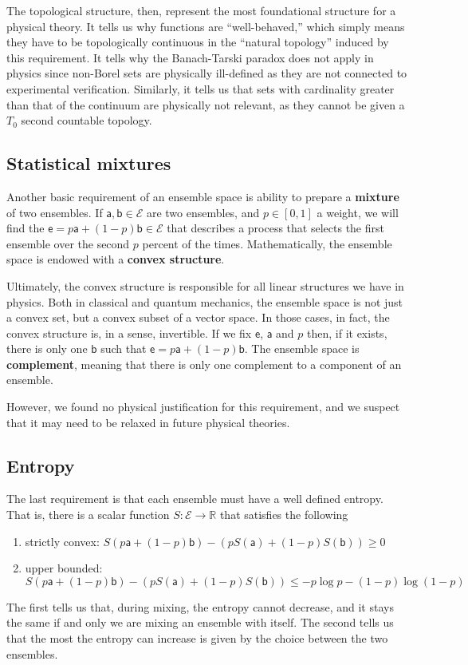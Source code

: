\documentclass[10pt,twocolumn, nofootinbib]{revtex4-2}
\newcommand{\ens}[1][e] {\mathsf{#1}} %
\newcommand{\Ens}[1][E] {\mathcal{#1}} %
\begin{document}
The topological structure, then, represent the most foundational structure for a physical theory. It tells us why functions are ``well-behaved,'' which simply means they have to be topologically continuous in the ``natural topology'' induced by this requirement. It tells why the Banach-Tarski paradox does not apply in physics since non-Borel sets are physically ill-defined as they are not connected to experimental verification. Similarly, it tells us that sets with cardinality greater than that of the continuum are physically not relevant, as they cannot be given a $T_0$ second countable topology.

\subsection{Statistical mixtures}
Another basic requirement of an ensemble space is ability to prepare a \textbf{mixture} of two ensembles. If $\ens[a], \ens[b] \in \Ens$ are two ensembles, and $p \in [0,1]$ a weight, we will find the $\ens = p \ens[a] + (1-p) \ens[b] \in \Ens$ that describes a process that selects the first ensemble over the second $p$ percent of the times. Mathematically, the ensemble space is endowed with a \textbf{convex structure}.

Ultimately, the convex structure is responsible for all linear structures we have in physics. Both in classical and quantum mechanics, the ensemble space is not just a convex set, but a convex subset of a vector space. In those cases, in fact, the convex structure is, in a sense, invertible. If we fix $\ens$, $\ens[a]$ and $p$ then, if it exists, there is only one $\ens[b]$ such that $\ens = p \ens[a] + (1-p) \ens[b]$. The ensemble space is \textbf{complement}, meaning that there is only one complement to a component of an ensemble.

However, we found no physical justification for this requirement, and we suspect that it may need to be relaxed in future physical theories.

\subsection{Entropy}
The last requirement is that each ensemble must have a well defined entropy. That is, there is a scalar function $S : \Ens \to \mathbb{R}$ that satisfies the following
\begin{enumerate}
	\item strictly convex: $S(p \ens[a] + (1-p) \ens[b]) - (p S(\ens[a]) + (1-p) S(\ens[b]) ) \geq 0$
	\item upper bounded: $S(p \ens[a] + (1-p) \ens[b]) - (p S(\ens[a]) + (1-p) S(\ens[b]) ) \leq - p \log p - (1-p) \log(1-p)$
\end{enumerate}
The first tells us that, during mixing, the entropy cannot decrease, and it stays the same if and only we are mixing an ensemble with itself. The second tells us that the most the entropy can increase is given by the choice between the two ensembles.
\end{document}
